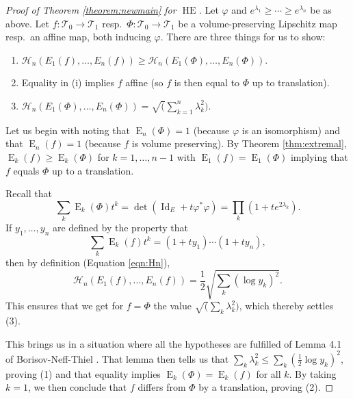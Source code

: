 \documentclass[11pt,letterpaper]{amsart}
\theoremstyle{definition}
\numberwithin{equation}{section}
\theoremstyle{definition}
\newcommand{\Tc}{\mathcal{T}}
\newcommand{\Hc}{\mathcal{H}}
\DeclareMathOperator{\En}{E}
\DeclareMathOperator{\Id}{Id}
\DeclareMathOperator{\HE}{HE}
\begin{document}
\begin{proof}[Proof of Theorem \ref{theorem:newmain} for $\HE$]
Let $\varphi$ and $e^{\lambda_1}\ge \cdots\ge e^{\lambda_n}$ be as above.  
Let $f: \Tc_0\to \Tc_1$ resp.\ $\Phi: \Tc_0\to \Tc_1$ be a volume-preserving Lipschitz map  resp.\ an affine map, both  inducing $\varphi$. There are three things for us  to 
show: 

\begin{enumerate}
\item $\Hc_n(E_1(f), \dots , E_n(f))\ge \Hc_n(E_1(\Phi), \dots , E_n(\Phi))$.
\item Equality in (i) implies $f$ affine (so $f$ is then equal to $\Phi$ up to translation).
\item $\Hc_n(E_1(\Phi), \dots , E_n(\Phi))=\sqrt (\sum_{k=1}^n 
\lambda_k^2)$.
\end{enumerate}

Let us begin with noting that $\En_n(\Phi)=1$ (because $\varphi$ is an isomorphism) and that  $\En_n(f)=1$ (because $f$ is volume preserving).  By Theorem \ref{thm:extremal}, $\En_k(f)\ge \En_k(\Phi)$ for $k=1,\dots, n-1$ with 
$\En_1(f)= \En_1(\Phi)$ implying  that $f$ equals $\Phi$ up to a translation.

Recall that 
\[
\textstyle \sum_k \En_k(\Phi)t^k=\det (\Id_E+t\varphi^*\varphi)= \prod_k (1+t e^{2\lambda_k}).
\]
If  $y_1, \dots, y_n$ are defined by the property  that 
\[
\textstyle \sum_k \En_k(f)t^k=(1+ty_1)\cdots (1+ty_n),
\]
then by definition (Equation \eqref{eqn:Hn}), 
\[
\textstyle \Hc_n(E_1(f), \dots, E_n(f))=\frac{1}{2}\sqrt{\sum_k (\log y_k)^2}.
\] 
This ensures that we get for $f=\Phi$
the value  $\sqrt (\sum_k \lambda^2_k)$, which thereby settles (3). 

This brings us in a situation  where all the hypotheses are fulfilled of Lemma 4.1  of 
Borisov-Neff-Thiel  \cite{BNST17}. That lemma  then tells us that $\sum_k \lambda_k^2\le \sum_k (\frac{1}{2}\log y_k)^2$, proving (1) and that equality implies $\En_k(\Phi)=\En_k(f)$ for all $k$. By taking  $k=1$, we then conclude that $f$ differs from $\Phi$ by a translation, proving (2).
\end{proof}
\end{document}
